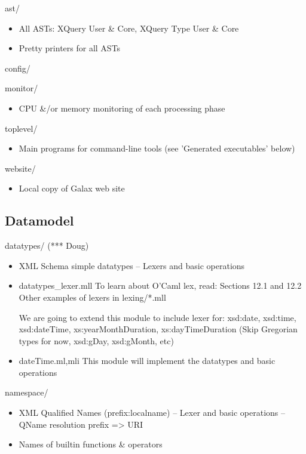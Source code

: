 ast/    
\begin{itemize}
\item  All ASTs: XQuery User \& Core, XQuery Type User \& Core
\item  Pretty printers for all ASTs
\end{itemize}

config/

monitor/	 
\begin{itemize}
\item  CPU \&/or memory monitoring of each processing phase
\end{itemize}

toplevel/	    
\begin{itemize}
\item    Main programs for command-line tools (see 'Generated executables'  below)
\end{itemize}

website/
\begin{itemize}
\item    Local copy of Galax web site
\end{itemize}

\subsection{Datamodel}

datatypes/  (*** Doug)
\begin{itemize}
\item    XML Schema simple datatypes  -- Lexers and basic operations 

\item    datatypes\_lexer.mll
    To learn about O'Caml lex, read:
      Sections 12.1 and 12.2
    Other examples of lexers in lexing/*.mll

    We are going to extend this module to include lexer for: 
      xsd:date, xsd:time, xsd:dateTime, xs:yearMonthDuration, xs:dayTimeDuration
      (Skip Gregorian types for now, xsd:gDay, xsd:gMonth, etc)

\item  dateTime.ml,mli
    This module will implement the datatypes and basic operations
\end{itemize}

namespace/
\begin{itemize}
\item   XML Qualified Names (prefix:localname)
  -- Lexer and basic operations
  -- QName resolution prefix => URI 
\item   Names of builtin functions \& operators 
\end{itemize}

